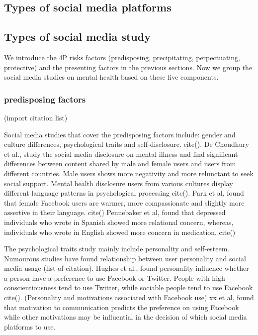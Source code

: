 \subsection{Types of social media platforms}



\subsection{Types of social media study} 
We introduce the 4P risks factors (predisposing, precipitating, perpectuating, protective) and the presenting factors in the previous sections. Now we group the social media studies on mental health based on these five components. 

\subsubsection{predisposing factors} (import citation list)

Social media studies that cover the predisposing factors include: gender and culture differences, psychological traits and self-disclosure. cite().  De Choudhury et al., study the social media disclosure on mental illness and find significant differences between content shared by male and female users and users from different countries. Male users shows more negativity and more relunctant to seek social support. Mental health disclosure users from various cultures display different language patterns in psychological processing cite(). Park et al, found that female Facebook users are warmer, more compassionate and slightly more assertive in their language. cite() Pennebaker et al, found that depressed individuals who wrote in Spanish showed more relational concern, whereas, individuals who wrote in English showed more concern in medication. cite()


The psychological traits study mainly include personality and self-esteem. Numourous studies have found relationship between user personality and social media usage (list of citation). Hughes et al., found personality influence whether a person have a preference to use Facebook or Twitter. People with high conscientiousness tend to use Twitter, while sociable people tend to use Facebook cite().  (Personality and motivations associated with Facebook use) xx et al, found that motivation to communication predicts the preference on using Facebook while other motivations may be influential in the decision of which social media platforms to use.


